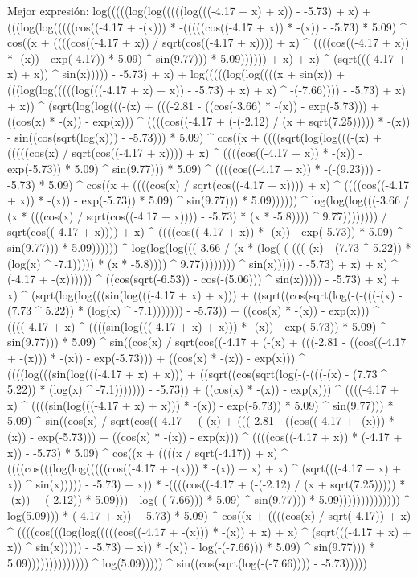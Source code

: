 Mejor expresión: log(((((log(log(((((log(((-4.17 + x) + x)) - -5.73) + x) + (((log(log(((((cos((-4.17 + -(x))) * -(((((cos((-4.17 + x)) * -(x)) - -5.73) * 5.09) ^ cos((x + ((((cos((-4.17 + x)) / sqrt(cos((-4.17 + x)))) + x) ^ ((((cos((-4.17 + x)) * -(x)) - exp(-4.17)) * 5.09) ^ sin(9.77))) * 5.09)))))) + x) + x) ^ (sqrt(((-4.17 + x) + x)) ^ sin(x))))) - -5.73) + x) + log(((((log(log((((x + sin(x)) + (((log(log(((((log(((-4.17 + x) + x)) - -5.73) + x) + x) ^ -(-7.66)))) - -5.73) + x) + x)) ^ (sqrt(log(log(((-(x) + (((-2.81 - ((cos(-3.66) * -(x)) - exp(-5.73))) + ((cos(x) * -(x)) - exp(x))) ^ ((((cos((-4.17 + (-(-2.12) / (x + sqrt(7.25))))) * -(x)) - sin((cos(sqrt(log(x))) - -5.73))) * 5.09) ^ cos((x + ((((sqrt(log(log(((-(x) + (((((cos(x) / sqrt(cos((-4.17 + x)))) + x) ^ ((((cos((-4.17 + x)) * -(x)) - exp(-5.73)) * 5.09) ^ sin(9.77))) * 5.09) ^ ((((cos((-4.17 + x)) * -(-(9.23))) - -5.73) * 5.09) ^ cos((x + ((((cos(x) / sqrt(cos((-4.17 + x)))) + x) ^ ((((cos((-4.17 + x)) * -(x)) - exp(-5.73)) * 5.09) ^ sin(9.77))) * 5.09)))))) ^ log(log(log(((-3.66 / (x * (((cos(x) / sqrt(cos((-4.17 + x)))) - -5.73) * (x * -5.8)))) ^ 9.77)))))))) / sqrt(cos((-4.17 + x)))) + x) ^ ((((cos((-4.17 + x)) * -(x)) - exp(-5.73)) * 5.09) ^ sin(9.77))) * 5.09)))))) ^ log(log(log(((-3.66 / (x * (log(-(-(((-(x) - (7.73 ^ 5.22)) * (log(x) ^ -7.1))))) * (x * -5.8)))) ^ 9.77)))))))) ^ sin(x))))) - -5.73) + x) + x) ^ (-4.17 + -(x)))))) ^ ((cos(sqrt(-6.53)) - cos(-(5.06))) ^ sin(x))))) - -5.73) + x) + x) ^ (sqrt(log(log(((sin(log(((-4.17 + x) + x))) + ((sqrt((cos(sqrt(log(-(-(((-(x) - (7.73 ^ 5.22)) * (log(x) ^ -7.1))))))) - -5.73)) + ((cos(x) * -(x)) - exp(x))) ^ ((((-4.17 + x) ^ ((((sin(log(((-4.17 + x) + x))) * -(x)) - exp(-5.73)) * 5.09) ^ sin(9.77))) * 5.09) ^ sin((cos(x) / sqrt(cos((-4.17 + (-(x) + (((-2.81 - ((cos((-4.17 + -(x))) * -(x)) - exp(-5.73))) + ((cos(x) * -(x)) - exp(x))) ^ ((((log(((sin(log(((-4.17 + x) + x))) + ((sqrt((cos(sqrt(log(-(-(((-(x) - (7.73 ^ 5.22)) * (log(x) ^ -7.1))))))) - -5.73)) + ((cos(x) * -(x)) - exp(x))) ^ ((((-4.17 + x) ^ ((((sin(log(((-4.17 + x) + x))) * -(x)) - exp(-5.73)) * 5.09) ^ sin(9.77))) * 5.09) ^ sin((cos(x) / sqrt(cos((-4.17 + (-(x) + (((-2.81 - ((cos((-4.17 + -(x))) * -(x)) - exp(-5.73))) + ((cos(x) * -(x)) - exp(x))) ^ ((((cos((-4.17 + x)) * (-4.17 + x)) - -5.73) * 5.09) ^ cos((x + ((((x / sqrt(-4.17)) + x) ^ ((((cos(((log(log(((((cos((-4.17 + -(x))) * -(x)) + x) + x) ^ (sqrt(((-4.17 + x) + x)) ^ sin(x))))) - -5.73) + x)) * -((((cos((-4.17 + (-(-2.12) / (x + sqrt(7.25))))) * -(x)) - -(-2.12)) * 5.09))) - log(-(-7.66))) * 5.09) ^ sin(9.77))) * 5.09)))))))))))))) ^ log(5.09))) * (-4.17 + x)) - -5.73) * 5.09) ^ cos((x + ((((cos(x) / sqrt(-4.17)) + x) ^ ((((cos(((log(log(((((cos((-4.17 + -(x))) * -(x)) + x) + x) ^ (sqrt(((-4.17 + x) + x)) ^ sin(x))))) - -5.73) + x)) * -(x)) - log(-(-7.66))) * 5.09) ^ sin(9.77))) * 5.09)))))))))))))) ^ log(5.09))))) ^ sin((cos(sqrt(log(-(-7.66)))) - -5.73)))))
